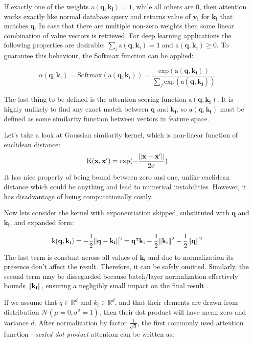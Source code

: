 If exactly one of the weights $\text{a}(\mathbf{q},\mathbf{k_i}) = 1$, while all others are $0$, then attention works exactly like normal database query and returns value of $\mathbf{v_i}$ for $\mathbf{k_i}$ that matches $\mathbf{q}$.
In case that there are multiple non-zero weights then some linear combination of value vectors is retrieved. 
For deep learning applications the following properties are desirable: $\sum_i \text{a}(\mathbf{q}, \mathbf{k_i}) = 1$ and $\text{a}(\mathbf{q}, \mathbf{k_i}) \ge 0$. To guarantee this behaviour, the Softmax function can be applied:

\[ \alpha(\mathbf{q}, \mathbf{k_i}) = \text{Softmax}(\text{a}(\mathbf{q}, \mathbf{k_i})) = \frac{\text{exp}(\text{a}(\mathbf{q}, \mathbf{k_i}))}{\sum_j \text{exp}(\text{a}(\mathbf{q}, \mathbf{k_j}))} \]

The last thing to be defined is the attention scoring function $\text{a}(\mathbf{q}, \mathbf{k_i})$.
It is highly unlikely to find any exact match between $\mathbf{q}$ and $\mathbf{k_i}$, so $\text{a}(\mathbf{q}, \mathbf{k_i})$ must be defined as some similarity function between vectors in feature space.

Let's take a look at Gaussian similarity kernel, which is non-linear function of euclidean distance:
\[\text{K}(\mathbf{x}, \mathbf{x'}) = \text{exp}(-\frac{\Vert\mathbf{x} - \mathbf{x'}\Vert}{2\sigma})\]
It has nice property of being bound between zero and one, unlike euclidean distance which could be anything and lead to numerical instabilities.
However, it has disadvantage of being computationally costly.

Now lets consider the kernel with exponentiation skipped, substituted with $\mathbf{q}$ and $\mathbf{k_i}$, and expanded form:

\[\text{k}(\mathbf{q}, \mathbf{k_i}) = -\frac{1}{2}\Vert\mathbf{q} - \mathbf{k_i}\Vert^2 = \mathbf{q}^\intercal \mathbf{k_i} - \frac{1}{2}\Vert\mathbf{k_i}\Vert^2 - \frac{1}{2}\Vert\mathbf{q}\Vert^2\]
The last term is constant across all values of $\mathbf{k_i}$ and due to normalization its presence don't affect the result. 
Therefore, it can be safely omitted. 
Similarly, the second term may be disregarded because batch/layer normalization effectively bounds $\Vert\mathbf{k_i}\Vert$, ensuring a negligibly small impact on the final result \cite{d2lAttentionScoring}.

If we assume that $q \in \mathbb{R}^{d}$ and $k_i \in \mathbb{R}^d$, and that their elements are drawn from distribution $\mathcal{N}(\mu=0, \sigma^2=1)$, then their dot product will have mean zero and variance $d$.
After normalization by factor $\frac{1}{\sqrt{d}}$, the first commonly used attention function - \emph{scaled dot product} attention \cite{Vaswani2017} can be written as:

